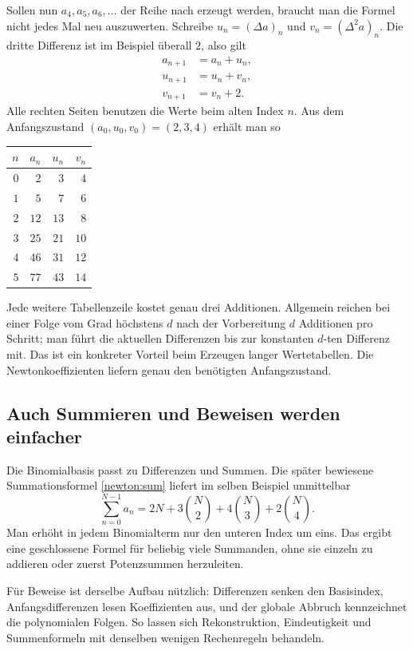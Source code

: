 Sollen nun $a_4,a_5,a_6,\ldots$ der Reihe nach erzeugt werden, braucht
man die Formel nicht jedes Mal neu auszuwerten. Schreibe
$u_n=(\Delta a)_n$ und $v_n=(\Delta^2a)_n$.
Die dritte Differenz ist im Beispiel überall $2$, also gilt
\[
 \begin{aligned}
 a_{n+1}&=a_n+u_n,\\
 u_{n+1}&=u_n+v_n,\\
 v_{n+1}&=v_n+2.
 \end{aligned}
\]
Alle rechten Seiten benutzen die Werte beim alten Index $n$.
Aus dem Anfangszustand $(a_0,u_0,v_0)=(2,3,4)$ erhält man so
\begin{center}
\begin{tabular}{@{}rrrr@{}}
\toprule
$n$ & $a_n$ & $u_n$ & $v_n$\\
\midrule
$0$ & $2$  & $3$  & $4$\\
$1$ & $5$  & $7$  & $6$\\
$2$ & $12$ & $13$ & $8$\\
$3$ & $25$ & $21$ & $10$\\
$4$ & $46$ & $31$ & $12$\\
$5$ & $77$ & $43$ & $14$\\
\bottomrule
\end{tabular}
\end{center}
Jede weitere Tabellenzeile kostet genau drei Additionen.
Allgemein reichen bei einer Folge vom Grad höchstens $d$ nach der
Vorbereitung $d$ Additionen pro Schritt; man führt die aktuellen
Differenzen bis zur konstanten $d$-ten Differenz mit.
Das ist ein konkreter Vorteil beim Erzeugen langer Wertetabellen.
Die Newtonkoeffizienten liefern genau den benötigten Anfangszustand.

\subsection*{Auch Summieren und Beweisen werden einfacher}

Die Binomialbasis passt zu Differenzen und Summen. Die später
bewiesene Summationsformel \eqref{newton:sum} liefert im selben Beispiel
unmittelbar
\[
 \sum_{n=0}^{N-1}a_n
 =2N+3\binom N2+4\binom N3+2\binom N4.
\]
Man erhöht in jedem Binomialterm nur den unteren Index um eins.
Das ergibt eine geschlossene Formel für beliebig viele Summanden,
ohne sie einzeln zu addieren oder zuerst Potenzsummen herzuleiten.

Für Beweise ist derselbe Aufbau nützlich: Differenzen senken den
Basisindex, Anfangsdifferenzen lesen Koeffizienten aus, und der globale
Abbruch kennzeichnet die polynomialen Folgen. So lassen sich
Rekonstruktion, Eindeutigkeit und Summenformeln mit denselben wenigen
Rechenregeln behandeln.

